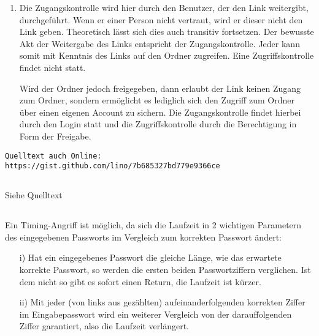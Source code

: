 \documentclass[ngerman]{fbi-aufgabenblatt}
\begin{document}
\begin{enumerate}
		\item
		Die Zugangskontrolle wird hier durch den Benutzer, der den Link weitergibt, durchgeführt. Wenn er einer Person nicht vertraut, wird er dieser nicht den Link geben. Theoretisch lässt sich dies auch transitiv fortsetzen. Der bewusste Akt der Weitergabe des Links entspricht der Zugangskontrolle. Jeder kann somit mit Kenntnis des Links auf den Ordner zugreifen. Eine Zugriffskontrolle findet nicht statt.
		
		Wird der Ordner jedoch freigegeben, dann erlaubt der Link keinen Zugang zum Ordner, sondern ermöglicht es lediglich sich den Zugriff zum Ordner über einen eigenen Account zu sichern. Die Zugangskontrolle findet hierbei durch den Login statt und die Zugriffskontrolle durch die Berechtigung in Form der Freigabe.
	\end{enumerate}
	
\newpage 
{}

	\texttt{Quelltext auch Online: https://gist.github.com/lino/7b685327bd779e9366ce}

	

	\subsection{}
	Siehe Quelltext

	\subsection{}

	Ein Timing-Angriff ist möglich, da sich die Laufzeit in 2 wichtigen Parametern des eingegebenen Passworts im Vergleich zum korrekten Passwort ändert:
	
	\begin{itemize}
		\item[i)] Hat ein eingegebenes Passwort die gleiche Länge, wie das erwartete korrekte Passwort, so werden die ersten beiden Passwortziffern verglichen. Ist dem nicht so gibt es sofort einen Return, die Laufzeit ist kürzer.
		\item[ii)] Mit jeder (von links aus gezählten) aufeinanderfolgenden korrekten Ziffer im Eingabepasswort wird ein weiterer Vergleich von der darauffolgenden Ziffer garantiert, also die Laufzeit verlängert.
	\end{itemize}

	\subsection{}
\end{document}

